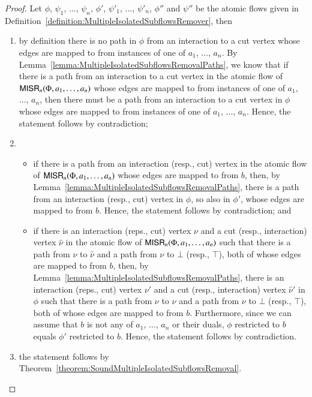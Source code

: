 \begin{proof}
Let $\phi$, $\psi_1$, $\dots$, $\psi_n$, $\phi'$, $\psi'_1$, $\dots$, $\psi'_n$, $\phi''$ and $\psi''$ be the atomic flows given in Definition~\ref{definition:MultipleIsolatedSubflowsRemover}, then
\begin{enumerate}
\item by definition there is no path in $\phi$ from an interaction to a cut vertex whose edges are mapped to from instances of one of $a_1$, $\dots$, $a_n$. By Lemma~\vref{lemma:MultipleIsolatedSubflowsRemovalPaths}, we know that if there is a path from an interaction to a cut vertex in the atomic flow of $\mathsf{MISR}_n(\Phi,a_1,\dots,a_n)$ whose edges are mapped to from instances of one of $a_1$, $\dots$, $a_n$, then there must be a path from an interaction to a cut vertex in $\phi$ whose edges are mapped to from instances of one of $a_1$, $\dots$, $a_n$. Hence, the statement follows by contradiction;
\item
\begin{itemize}
 \item if there is a path from an interaction (resp., cut) vertex in the atomic flow of $\mathsf{MISR}_n(\Phi,a_1,\dots,a_n)$ whose edges are mapped to from $b$, then, by Lemma~\ref{lemma:MultipleIsolatedSubflowsRemovalPaths}, there is a path from an interaction (resp., cut) vertex in $\phi$, so also in $\phi'$, whose edges are mapped to from $b$. Hence, the statement follows by contradiction; and
 \item if there is an interaction (reps., cut) vertex $\nu$ and a cut (resp., interaction) vertex $\hat\nu$ in the atomic flow of $\mathsf{MISR}_n(\Phi,a_1,\dots,a_n)$ such that there is a path from $\nu$ to $\hat\nu$ and a path from $\nu$ to $\bot$ (resp., $\top$), both of whose edges are mapped to from $b$, then, by Lemma~\ref{lemma:MultipleIsolatedSubflowsRemovalPaths}, there is an interaction (reps., cut) vertex $\nu'$ and a cut (resp., interaction) vertex $\hat\nu'$ in $\phi$ such that there is a path from $\nu$ to $\hat\nu$ and a path from $\nu$ to $\bot$ (resp., $\top$), both of whose edges are mapped to from $b$. Furthermore, since we can assume that $b$ is not any of $a_1$, $\dots$, $a_n$ or their duals, $\phi$ restricted to $b$ equals $\phi'$ restricted to $b$. Hence, the statement follows by contradiction.
\end{itemize}
\item the statement follows by Theorem~\vref{theorem:SoundMultipleIsolatedSubflowsRemoval}.
\end{enumerate}
\end{proof}

